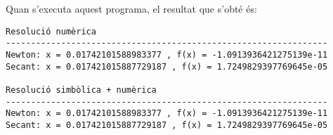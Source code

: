 

Quan s'executa aquest programa, el resultat que s'obté és:
\lstset{
	language=,
	numbers=none,
	frame=none
}
\begin{lstlisting}
Resolució numèrica
----------------------------------------------------------------
Newton: x = 0.01742101588983377 , f(x) = -1.0913936421275139e-11
Secant: x = 0.017421015887729187 , f(x) = 1.7249829397769645e-05

Resolució simbòlica + numèrica
----------------------------------------------------------------
Newton: x = 0.01742101588983377 , f(x) = -1.0913936421275139e-11
Secant: x = 0.017421015887729187 , f(x) = 1.7249829397769645e-05
\end{lstlisting} 
